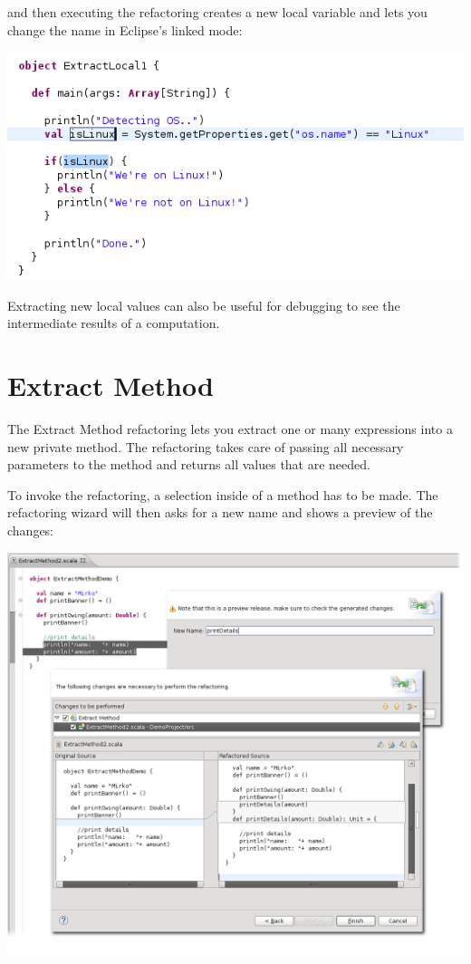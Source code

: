 \documentclass[10pt,a4paper,oneside]{scrreprt}
\begin{document}
and then executing the refactoring creates a new local variable and lets you change the name in Eclipse's linked mode:

\begin{center}
  \includegraphics[width=0.8\linewidth]{extract_local_screenshot_3.png}
\end{center}

Extracting new local values can also be useful for debugging to see the intermediate results of a computation.

\section{Extract Method}

The Extract Method refactoring lets you extract one or many expressions into a new private method. The refactoring takes care of passing all necessary parameters to the method and returns all values that are needed.

To invoke the refactoring, a selection inside of a method has to be made. The refactoring wizard will then asks for a new name and shows a preview of the changes:

\begin{center}
  \includegraphics[width=\linewidth]{extract_method_screenshot_1.png}
\end{center}
\end{document}
